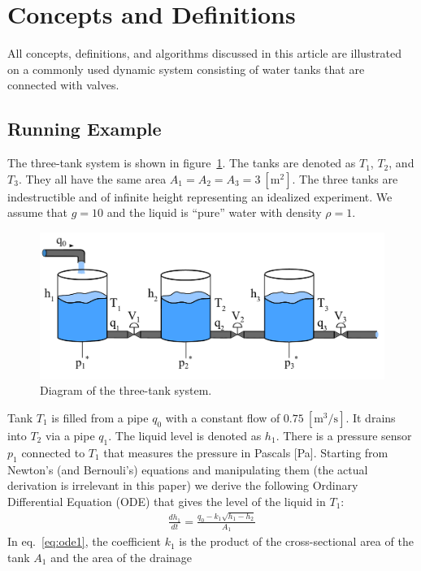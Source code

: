 \section{Concepts and Definitions}\label{sec:concepts}
%
All concepts, definitions, and algorithms discussed in this article
are illustrated on a commonly used dynamic system consisting of water
tanks that are connected with valves.
%
\subsection{Running Example}
%
The three-tank system is shown in figure~\ref{fig:three_tanks}. The
tanks are denoted as $T_1$, $T_2$, and $T_3$. They all have the same
area $A_1 = A_2 = A_3 = 3~[\textrm{m}^2]$. The three tanks are
indestructible and of infinite height representing an idealized
experiment.  We assume that $g = 10$ and the liquid is ``pure'' water
with density $\rho = 1$.
%
\begin{figure}[htb]
  \centering
  \includegraphics[width=1\columnwidth]{3-tanks}
  \caption{Diagram of the three-tank system.}
  \label{fig:three_tanks}
\end{figure}
\par\noindent
%
Tank $T_1$ is filled from a pipe $q_0$ with a constant flow of
$0.75~[\textrm{m}^3/\textrm{s}]$. It drains into $T_2$ via a pipe
$q_1$. The liquid level is denoted as $h_1$. There is a pressure
sensor $p_1$ connected to $T_1$ that measures the pressure in Pascals
[Pa]. Starting from Newton's (and Bernouli's) equations and
manipulating them (the actual derivation is irrelevant in this paper)
we derive the following Ordinary Differential Equation (ODE) that
gives the level of the liquid in $T_1$:
%
\begin{eqnarray}
%
\frac{d h_1}{dt} = \frac{q_0 - k_1 \sqrt{h_1 - h_2}}{A_1}\label{eq:ode1}
%
\end{eqnarray}
%
In eq.~\ref{eq:ode1}, the coefficient $k_1$ is the product of the
cross-sectional area of the tank $A_1$ and the area of the drainage
